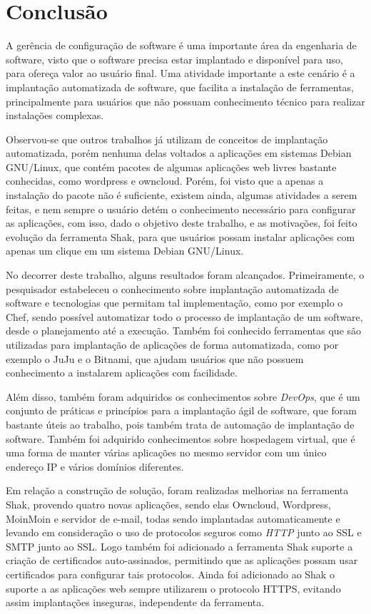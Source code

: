 \chapter{Conclusão}
\label{cap-conclusoes}

A gerência de configuração de software é uma importante área da engenharia de software,
visto que o software precisa estar implantado e disponível para uso, para ofereça 
valor ao usuário final. Uma atividade importante a este cenário é a implantação
automatizada de software, que facilita a instalação de ferramentas, principalmente
para usuários que não possuam conhecimento técnico para realizar instalações complexas.

Observou-se que outros trabalhos já utilizam de conceitos de implantação automatizada,
porém nenhuma delas voltados a aplicações em sistemas Debian GNU/Linux, que contém
pacotes de algumas aplicações web livres bastante conhecidas, como wordpress e
owncloud. Porém, foi visto que a apenas a instalação do pacote não é suficiente, 
existem ainda, algumas atividades a serem feitas, e nem sempre o usuário detém
o conhecimento necessário para configurar as aplicações, com isso, dado o objetivo
deste trabalho, e as motivações, foi feito evolução da ferramenta Shak, para 
que usuários possam instalar aplicações com apenas um clique em um sistema Debian
GNU/Linux.

No decorrer deste trabalho, alguns resultados foram alcançados. Primeiramente, o
pesquisador estabeleceu o conhecimento sobre implantação automatizada
de software e tecnologias que permitam tal implementação, como por exemplo o Chef, 
sendo possível automatizar todo o processo de implantação de um software,
desde o planejamento até a execução. Também foi conhecido ferramentas que são
utilizadas para implantação de aplicações de forma automatizada, como por exemplo
o JuJu e o Bitnami, que ajudam usuários que não possuem conhecimento a
instalarem aplicações com facilidade.

Além disso, também foram adquiridos os conhecimentos sobre \textit{DevOps}, que é um conjunto
de práticas e princípios para a implantação ágil de software, que foram bastante 
úteis ao trabalho, pois também trata de automação de implantação de software. Também 
foi adquirido conhecimentos sobre hospedagem virtual, que é uma forma de manter
várias aplicações no mesmo servidor com um único endereço IP e vários domínios diferentes.

Em relação a construção de solução, foram realizadas melhorias na ferramenta Shak,
provendo quatro novas aplicações, sendo elas Owncloud, Wordpress, MoinMoin e 
servidor de e-mail, todas sendo implantadas automaticamente e 
levando em consideração o uso de protocolos seguros como \textit{HTTP} junto ao SSL e SMTP 
junto ao SSL. Logo também foi adicionado a
ferramenta Shak suporte a criação de certificados auto-assinados, permitindo que
as aplicações possam usar certificados para configurar tais protocolos. Ainda foi
adicionado ao Shak o suporte a as aplicações web sempre utilizarem
o protocolo HTTPS, evitando assim implantações inseguras, independente da ferramenta.

